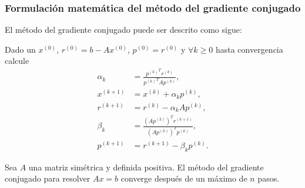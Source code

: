 \begin{frame}
	\frametitle{Formulación matemática del método del gradiente conjugado}
	El \alert{método del gradiente conjugado} puede ser descrito como
	sigue:

	Dado un $x^{\left(0\right)}$,
	$r^{\left(0\right)}=b-Ax^{\left(0\right)}$,
	$p^{\left(0\right)}=r^{\left(0\right)}$ y $\forall k\geq0$ hasta
	convergencia calcule
	\begin{align*}
		\alpha_{k}
		 & =
		\frac{
			{p^{\left(k\right)}}^{T}
			r^{\left(k\right)}
		}{
			{p^{\left(k\right)}}^{T}
		Ap^{\left(k\right)}}, \\
		x^{\left(k+1\right)}
		 & =
		x^{\left(k\right)}+
		\alpha_{k}
		p^{\left(k\right)},   \\
		r^{\left(k+1\right)}
		 & =
		r^{\left(k\right)}-
		\alpha_{k}
		Ap^{\left(k\right)},  \\
		\beta_{k}
		 & =
		\frac{
			{\left(Ap^{\left(k\right)}\right)}^{T}
			r^{\left(k+1\right)}
		}{
			{\left(Ap^{\left(k\right)}\right)}^{T}
		p^{\left(k\right)}},  \\
		p^{\left(k+1\right)}
		 & =
		r^{\left(k+1\right)}-
		\beta_{k}p^{\left(k\right)}.
	\end{align*}

	\begin{theorem}
		Sea $A$ una matriz simétrica y definida positiva.
		El método del gradiente conjugado para resolver $Ax=b$ converge
		después de un máximo de $n$ pasos.
	\end{theorem}
\end{frame}

